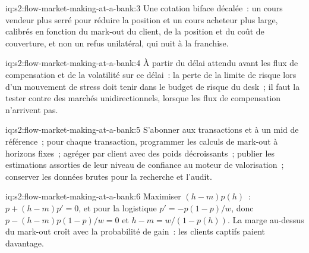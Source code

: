 \begin{solution}{iq:s2:flow-market-making-at-a-bank:3}
Une cotation biface décalée~: un cours vendeur plus serré pour réduire la position et un cours acheteur plus large, calibrés en fonction du mark-out du client, de la position et du coût de
couverture, et non un refus unilatéral, qui nuit à la franchise.
\end{solution}

\begin{solution}{iq:s2:flow-market-making-at-a-bank:4}
À partir du délai attendu avant les flux de compensation et de la volatilité sur ce délai~: la perte de la limite de risque lors d'un mouvement de stress doit tenir dans le budget de risque du desk~; il faut
la tester contre des marchés unidirectionnels, lorsque les flux de compensation n'arrivent pas.
\end{solution}

\begin{solution}{iq:s2:flow-market-making-at-a-bank:5}
S'abonner aux transactions et à un mid de référence~; pour chaque transaction, programmer les calculs de mark-out à horizons fixes~; agréger par client avec des
poids décroissants~; publier les estimations assorties de leur niveau de confiance au moteur de valorisation~; conserver les données brutes pour la recherche et l'audit.
\end{solution}

\begin{solution}{iq:s2:flow-market-making-at-a-bank:6}
Maximiser $(h - m)p(h)$~: $p + (h - m)p' = 0$, et pour la logistique $p' = -p(1-p)/w$, donc $p - (h - m)p(1-p)/w = 0$ et $h - m = w/(1 - p(h))$. La
marge au-dessus du mark-out croît avec la probabilité de gain~: les clients captifs paient davantage.
\end{solution}
